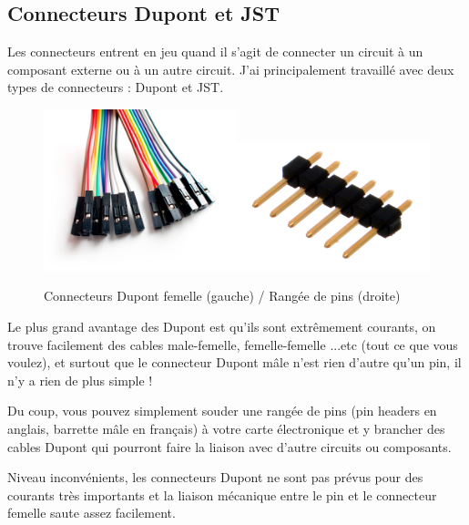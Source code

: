 \documentclass[a4paper, 11pt]{report}
\begin{document}
\subsection{Connecteurs Dupont et JST}

Les connecteurs entrent en jeu quand il s'agit de connecter un circuit
à un composant externe ou à un autre circuit. J'ai principalement
travaillé avec deux types de connecteurs : Dupont et JST.

\begin{figure}[h]
\caption{Connecteurs Dupont femelle (gauche) / Rangée de pins (droite)}

\centering{}\includegraphics[width=0.5\textwidth]{images/dupont_femelle.jpg}\includegraphics[width=0.5\textwidth]{images/pin_header.jpg}
\end{figure}

Le plus grand avantage des Dupont est qu'ils sont extrêmement courants,
on trouve facilement des cables male-femelle, femelle-femelle ...etc
(tout ce que vous voulez), et surtout que le connecteur Dupont mâle
n'est rien d'autre qu'un pin, il n'y a rien de plus simple !

Du coup, vous pouvez simplement souder une rangée de pins (pin headers
en anglais, barrette mâle en français) à votre carte électronique
et y brancher des cables Dupont qui pourront faire la liaison avec
d'autre circuits ou composants.

Niveau inconvénients, les connecteurs Dupont ne sont pas prévus pour
des courants très importants et la liaison mécanique entre le pin
et le connecteur femelle saute assez facilement.
\end{document}
